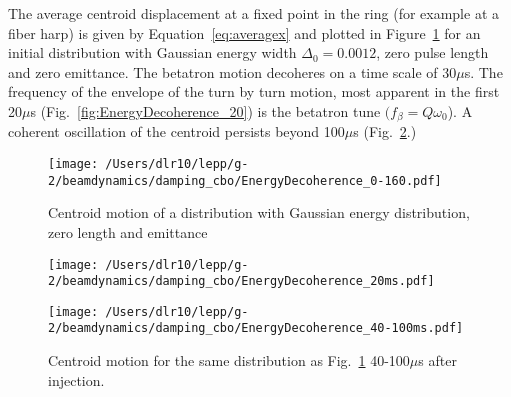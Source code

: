 \documentclass[10pt]{report}
\begin{document}
The average centroid displacement at a fixed point in the ring (for example at a fiber harp) is given by Equation~\ref{eq:averagex} and plotted in Figure~\ref{fig:EnergyDecoherence_160ms} for an initial distribution with Gaussian energy width $\Delta_0=0.0012$, zero pulse length and zero emittance. The betatron motion decoheres on a time scale of 30$\mu$s.
The frequency of the envelope of the turn by turn motion, most apparent in the first 20$\mu$s (Fig.~\ref{fig:EnergyDecoherence_20}) is the betatron tune $(f_\beta = Q\omega_0$).   
A coherent oscillation of the centroid persists beyond 100$\mu$s (Fig.~\ref{fig:EnergyDecoherence_40-100}.)
\begin{figure}[htbp]
\centering
   \texttt{[image: /Users/dlr10/lepp/g-2/beamdynamics/damping\_cbo/EnergyDecoherence\_0-160.pdf]} 
\caption{Centroid motion of a distribution with Gaussian energy distribution, zero length and emittance
   \label{fig:EnergyDecoherence_160ms}}
\end{figure}
\begin{figure}[htbp] %
\begin{minipage}[t]{0.48\textwidth}
   \centering
   \texttt{[image: /Users/dlr10/lepp/g-2/beamdynamics/damping\_cbo/EnergyDecoherence\_20ms.pdf]} 
   \caption{Centroid motion for the same distribution as Fig. \ref{fig:EnergyDecoherence_160ms} for the first 20$\mu$s after injection. The
frequency of the envelope is the betatron tune. \label{fig:EnergyDecoherence_20}}
 \end{minipage}
\hfill
\begin{minipage}[t]{0.48\textwidth}
\centering
   \texttt{[image: /Users/dlr10/lepp/g-2/beamdynamics/damping\_cbo/EnergyDecoherence\_40-100ms.pdf]} 
\caption{Centroid motion for the same distribution as Fig.~\ref{fig:EnergyDecoherence_160ms} 40-100$\mu$s after injection.
   \label{fig:EnergyDecoherence_40-100}}
\end{minipage}
\end{figure}
%
\end{document}
